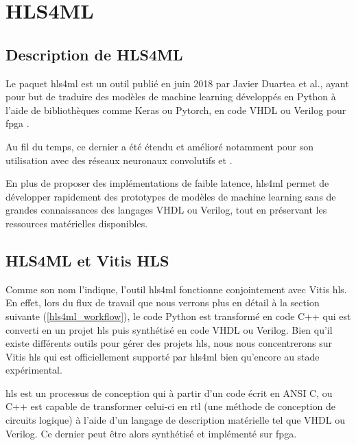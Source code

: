 
\chapter{HLS4ML} %

\label{HLS4ML} %


\section{Description de HLS4ML}

Le paquet \acrshort{hls4ml} est un outil publié en juin 2018 par Javier Duartea et al., ayant pour but de traduire des modèles de machine learning développés en Python à l'aide de bibliothèques comme Keras ou Pytorch, en code VHDL ou Verilog pour \acrshort{fpga} \cite{duarte_fast_2018}.

Au fil du temps, ce dernier a été étendu et amélioré notamment pour son utilisation avec des réseaux neuronaux convolutifs \cite{aarrestad_fast_2021} et \cite{ghielmetti_real-time_2022}.

En plus de proposer des implémentations de faible latence, \acrshort{hls4ml} permet de développer rapidement des prototypes de modèles de machine learning sans de grandes connaissances des langages VHDL ou Verilog, tout en préservant les ressources matérielles disponibles.

\section{HLS4ML et Vitis HLS}

Comme son nom l'indique, l'outil \acrfull{hls4ml} fonctionne conjointement avec Vitis \acrfull{hls}. En effet, lors du flux de travail que nous verrons plus en détail à la section suivante (\ref{hls4ml_workflow}), le code Python est transformé en code C++ qui est converti en un projet \acrshort{hls} puis synthétisé en code VHDL ou Verilog. Bien qu'il existe différents outils pour gérer des projets \acrshort{hls}, nous nous concentrerons sur Vitis \acrshort{hls} qui est officiellement supporté par \acrshort{hls4ml} bien qu'encore au stade expérimental.

\acrfull{hls} est un processus de conception qui à partir d'un code écrit en ANSI C, ou C++ est capable de transformer celui-ci en \acrfull{rtl} (une méthode de conception de circuits logique) à l'aide d'un langage de description matérielle tel que VHDL ou Verilog. Ce dernier peut être alors synthétisé et implémenté sur \acrshort{fpga}.\\


